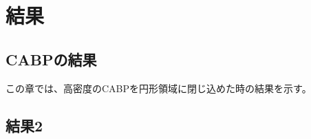 \documentclass[/Users/ikedahajime/GitHub/reserch/master_report/thesis]{subfiles}
\begin{document}
\chapter{結果}
\section{CABPの結果}
この章では、高密度のCABPを円形領域に閉じ込めた時の結果を示す。
\section{結果2}
\end{document}
